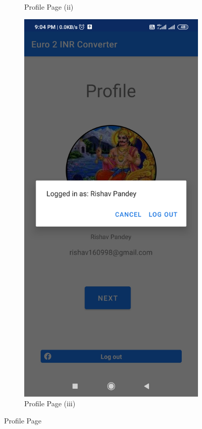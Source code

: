 \documentclass[12pt]{article}
\begin{document}
\begin{figure}[h]
\begin{subfigure}[h]{0.3\textwidth}
\caption{Profile Page (ii)}
\label{Profile Page (ii)}
\end{subfigure}
\hfill
\begin{subfigure}[h]{0.3\textwidth}
\centering
\includegraphics[scale=0.065]{146977781-d3ed2dc1-6e53-4d13-937d-9bafd6e2caa8.jpg}
\caption{Profile Page (iii)}
\label{Profile Page (iii)}
\end{subfigure}
\caption{Profile Page}
\label{Profile Page}
\end{figure}
\clearpage
\end{document}
